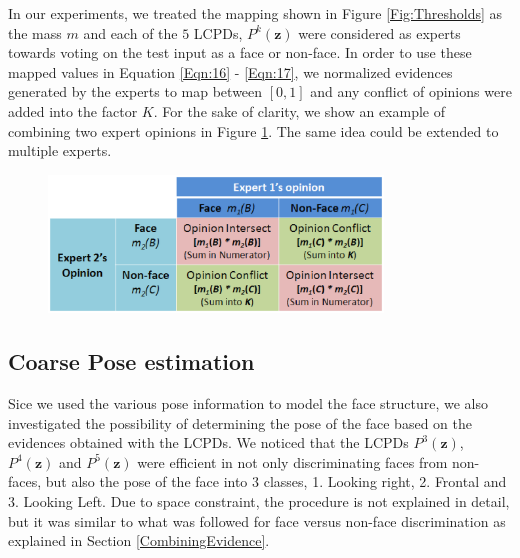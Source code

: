 \documentclass[times, 10pt,twocolumn]{article}
\begin{document}
In our experiments, we treated the mapping shown in Figure
\ref{Fig:Thresholds} as the mass $m$ and each of the $5$ LCPDs,
$P^k(\mathbf z)$ were considered as experts towards voting on the
test input as a face or non-face. In order to use these mapped
values in Equation \ref{Eqn:16} - \ref{Eqn:17}, we normalized
evidences generated by the experts to map between $[0,1]$ and any
conflict of opinions were added into the factor $K$. For the sake of
clarity, we show an example of combining two expert opinions in
Figure \ref{Fig:DST}. The same idea could be extended to multiple
experts.
\begin{figure}[h]
\centering
\hspace{-0.2in}\includegraphics[width=3.5in]{Figure12.eps}
\caption{{\bf {\selectfont }}} \label{Fig:DST}
\end{figure}

\subsection{Coarse Pose estimation}\label{CoarsePoseEstimation}
Sice we used the various pose information to model the face
structure, we also investigated the possibility of determining the
pose of the face based on the evidences obtained with the LCPDs. We
noticed that the LCPDs $P^3(\mathbf z)$, $P^4(\mathbf z)$ and
$P^5(\mathbf z)$ were efficient in not only discriminating faces
from non-faces, but also the pose of the face into $3$ classes, 1.
Looking right, 2. Frontal and 3. Looking Left. Due to space
constraint, the procedure is not explained in detail, but it was
similar to what was followed for face versus non-face discrimination
as explained in Section \ref{CombiningEvidence}.
\end{document}
